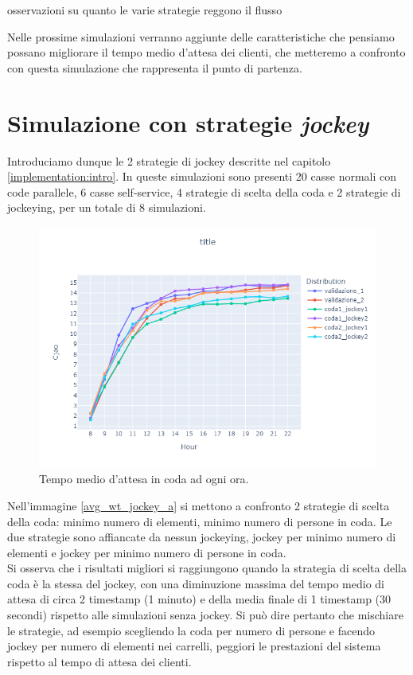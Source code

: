
osservazioni su quanto le varie strategie reggono il flusso

Nelle prossime simulazioni verranno aggiunte delle caratteristiche che pensiamo possano migliorare il tempo medio d'attesa dei clienti, che metteremo a confronto con questa simulazione che rappresenta il punto di partenza.

\section{Simulazione con strategie \textit{jockey}}

Introduciamo dunque le 2 strategie di jockey descritte nel capitolo \ref{implementation:intro}. In queste simulazioni sono presenti 20 casse normali con code parallele, 6 casse self-service, 4 strategie di scelta della coda e 2 strategie di jockeying, per un totale di 8 simulazioni.

\begin{figure}[htp!]
	\centering
	\includegraphics[width=12cm]{"images/results/avg_wt_jockey_a.png"}
	\caption{Tempo medio d'attesa in coda ad ogni ora.}
	\label{fig:avg_wt_jockey_a}
\end{figure}

Nell'immagine \ref{avg_wt_jockey_a} si mettono a confronto 2 strategie di scelta della coda: minimo numero di elementi, minimo numero di persone in coda. Le due strategie sono affiancate da nessun jockeying, jockey per minimo numero di elementi e jockey per minimo numero di persone in coda. \\ 
Si osserva che i risultati migliori si raggiungono quando la strategia di scelta della coda è la stessa del jockey, con una diminuzione massima del tempo medio di attesa di circa 2 timestamp (1 minuto) e della media finale di 1 timestamp (30 secondi) rispetto alle simulazioni senza jockey. Si può dire pertanto che mischiare le strategie, ad esempio scegliendo la coda per numero di persone e facendo jockey per numero di elementi nei carrelli, peggiori le prestazioni del sistema rispetto al tempo di attesa dei clienti.

